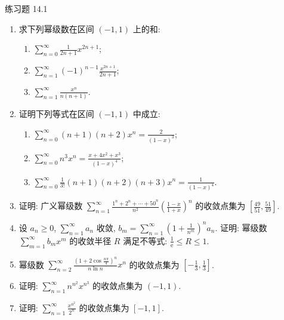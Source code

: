 \begin{exblock}{练习题 14.1}
\begin{enumerate}
  (3) 举例说明在 (1) 中 $R>\min\{R_{1},R_{2}\}$ 与在 (2) 中 $R>R_{1}R_{2}$ 的情形都是可能发生的.
  \item 求下列幂级数在区间 $(-1,1)$ 上的和:
  \begin{enumerate}
    \item $\displaystyle\sum_{n=0}^{\infty}\frac{1}{2n+1}x^{2n+1}$;
    \item $\displaystyle\sum_{n=1}^{\infty}(-1)^{n-1}\frac{x^{2n+1}}{2n+1}$;
    \item $\displaystyle\sum_{n=1}^{\infty}\frac{x^{n}}{n(n+1)}$.
  \end{enumerate}
  \item 证明下列等式在区间 $(-1,1)$ 中成立:
  \begin{enumerate}
    \item $\displaystyle\sum_{n=0}^{\infty}(n+1)(n+2)x^{n}=\frac{2}{(1-x)^{3}}$;
    \item $\displaystyle\sum_{n=0}^{\infty}n^{3}x^{n}=\frac{x+4x^{2}+x^{3}}{(1-x)^{4}}$;
    \item $\displaystyle\sum_{n=0}^{\infty}\frac{1}{3!}(n+1)(n+2)(n+3)x^{n}=\frac{1}{(1-x)^{4}}$.
  \end{enumerate}
  \item 证明: 广义幂级数 $\displaystyle\sum_{n=1}^{\infty}\frac{1^{n}+2^{n}+\cdots+50^{n}}{n^{2}}\left(\frac{1-x}{1+x}\right)^{n}$ 的收敛点集为 $\left[\frac{49}{51},\frac{51}{49}\right]$.
  \item 设 $a_{n}\geqslant0$, $\sum_{n=1}^{\infty}a_{n}$ 收敛, $b_{m}=\sum_{n=1}^{\infty}\left(1+\frac{1}{n^{m}}\right)^{n}a_{n}$. 证明: 幂级数 $\sum_{m=1}^{\infty}b_{m}x^{m}$ 的收敛半径 $R$ 满足不等式: $\frac{1}{\mathrm{e}}\leqslant R\leqslant1$.
  \item 幂级数 $\displaystyle\sum_{n=2}^{\infty}\frac{\left(1+2\cos\frac{n\pi}{4}\right)^{n}}{n\ln n}x^{n}$ 的收敛点集为 $\left[-\frac{1}{3},\frac{1}{3}\right]$.
  \item 证明: $\displaystyle\sum_{n=1}^{\infty}n^{n^{2}}x^{n^{3}}$ 的收敛点集为 $(-1,1)$.
  \item 证明: $\displaystyle\sum_{n=1}^{\infty}\frac{x^{n^{2}}}{2^{n}}$ 的收敛点集为 $[-1,1]$.
\end{enumerate}
\end{exblock}

